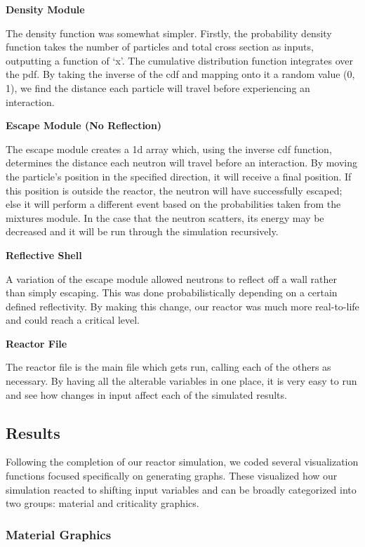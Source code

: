 \documentclass{notes}
\begin{document}
\textbf{Density Module}

The density function was somewhat simpler. Firstly, the probability density function takes the number of particles and total cross section as inputs, outputting a function of `x'. The cumulative distribution function integrates over the pdf. By taking the inverse of the cdf and mapping onto it a random value (0, 1), we find the distance each particle will travel before experiencing an interaction. \cite{OpenMC}

\textbf{Escape Module (No Reflection)}

The escape module creates a 1d array which, using the inverse cdf function, determines the distance each neutron will travel before an interaction. By moving the particle's position in the specified direction, it will receive a final position. If this position is outside the reactor, the neutron will have successfully escaped; else it will perform a different event based on the probabilities taken from the mixtures module. In the case that the neutron scatters, its energy may be decreased and it will be run through the simulation recursively.

\textbf{Reflective Shell}

A variation of the escape module allowed neutrons to reflect off a wall rather than simply escaping. This was done probabilistically depending on a certain defined reflectivity. By making this change, our reactor was much more real-to-life and could reach a critical level.

\textbf{Reactor File}

The reactor file is the main file which gets run, calling each of the others as necessary. By having all the alterable variables in one place, it is very easy to run and see how changes in input affect each of the simulated results.

\subsection*{Results}

Following the completion of our reactor simulation, we coded several visualization functions focused specifically on generating graphs. These visualized how our simulation reacted to shifting input variables and can be broadly categorized into two groups: material and criticality graphics.

\subsubsection*{Material Graphics}
\end{document}
